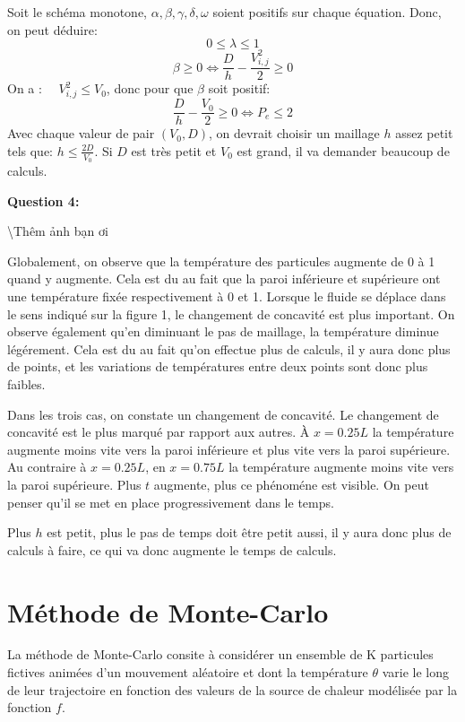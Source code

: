 \documentclass[
  11pt,
  dvipsnames]{article}
\begin{document}
Soit le schéma monotone, \(\alpha ,\beta,\gamma,\delta,\omega\) soient positifs sur chaque équation. Donc, on peut déduire:
\[ 0 \leq \lambda \leq 1\]
\[ \beta \geq 0 \Leftrightarrow \frac {D}{h}-\frac {V_{i,j}^2}{2} \geq 0\]
On a : \(\quad V_{i,j}^2 \leq V_0\), donc pour que \(\beta\) soit positif:
\[\frac {D}{h}-\frac {V_0}{2} \geq 0 \Leftrightarrow P_e\leq 2\]
Avec chaque valeur de pair \((V_0,D)\), on devrait choisir un maillage \(h\) assez petit tels que: \(h \leq \frac{2D}{V_0}\). Si \(D\) est très petit et \(V_0\) est grand, il va demander beaucoup de calculs.

\textbf{Question 4:}

\textbackslash Thêm ảnh bạn ơi

Globalement, on observe que la température des particules augmente de 0 à 1 quand y augmente. Cela est du au fait que la paroi inférieure et supérieure ont une température fixée respectivement à 0 et 1. Lorsque le fluide se déplace dans le sens indiqué sur la figure 1, le changement de concavité est plus important. On observe également qu'en diminuant le pas de maillage, la température diminue légérement. Cela est du au fait qu'on effectue plus de calculs, il y aura donc plus de points, et les variations de températures entre deux points sont donc plus faibles.

Dans les trois cas, on constate un changement de concavité. Le changement de concavité est le plus marqué par rapport aux autres. À \(x=0.25L\) la température augmente moins vite vers la paroi inférieure et plus vite vers la paroi supérieure. Au contraire à \(x=0.25L\), en \(x=0.75L\) la température augmente moins vite vers la paroi supérieure. Plus \(t\) augmente, plus ce phénoméne est visible. On peut penser qu'il se met en place progressivement dans le temps.

Plus \(h\) est petit, plus le pas de temps doit être petit aussi, il y aura donc plus de calculs à faire, ce qui va donc augmente le temps de calculs.

\hypertarget{muxe9thode-de-monte-carlo}{%
\section{Méthode de Monte-Carlo}\label{muxe9thode-de-monte-carlo}}

La méthode de Monte-Carlo consite à considérer un ensemble de K particules fictives animées d'un mouvement aléatoire et dont la température \(\theta\) varie le long de leur trajectoire en fonction des valeurs de la source de chaleur modélisée par la fonction \(f\).
\end{document}
